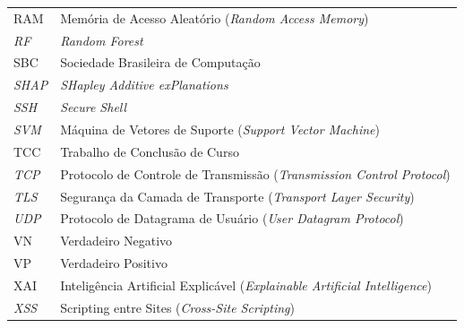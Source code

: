 \begin{longtable}{@{}p{3.8cm}p{\dimexpr\textwidth-3.8cm\relax}@{}}
    RAM            & Memória de Acesso Aleatório (\textit{Random Access Memory})                                                     \\[4pt]
    \textit{RF}    & \textit{Random Forest}                                                                                          \\[4pt]
    SBC            & Sociedade Brasileira de Computação                                                                              \\[4pt]
    \textit{SHAP}  & \textit{SHapley Additive exPlanations}                                                                          \\[4pt]
    \textit{SSH}   & \textit{Secure Shell}                                                                                           \\[4pt]
    \textit{SVM}   & Máquina de Vetores de Suporte (\textit{Support Vector Machine})                                                 \\[4pt]
    TCC            & Trabalho de Conclusão de Curso                                                                                  \\[4pt]
    \textit{TCP}   & Protocolo de Controle de Transmissão (\textit{Transmission Control Protocol})                                   \\[4pt]
    \textit{TLS}   & Segurança da Camada de Transporte (\textit{Transport Layer Security})                                           \\[4pt]
    \textit{UDP}   & Protocolo de Datagrama de Usuário (\textit{User Datagram Protocol})                                             \\[4pt]
    VN             & Verdadeiro Negativo                                                                                             \\[4pt]
    VP             & Verdadeiro Positivo                                                                                             \\[4pt]
    XAI            & Inteligência Artificial Explicável (\textit{Explainable Artificial Intelligence})                               \\[4pt]
    \textit{XSS}   & Scripting entre Sites (\textit{Cross-Site Scripting})                                                           \\
\end{longtable}
